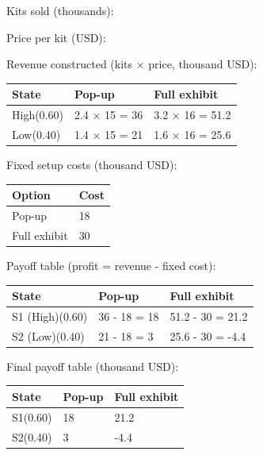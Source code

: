 \documentclass[11pt]{article}
\begin{document}
	
	Kits sold (thousands):
	
	Price per kit (USD):
	
	Revenue constructed (kits × price, thousand USD):
	\begin{center}
		\begin{tabular}{lll}
			\toprule
			State & Pop-up & Full exhibit \\
			\midrule
			High\newline (0.60) & 2.4 × 15 = 36 & 3.2 × 16 = 51.2 \\
			Low\newline (0.40) & 1.4 × 15 = 21 & 1.6 × 16 = 25.6 \\
			\bottomrule
		\end{tabular}
	\end{center}
	
	
	Fixed setup costs (thousand USD):
	\begin{center}
		\begin{tabular}{ll}
			\toprule
			Option & Cost \\
			\midrule
			Pop-up & 18 \\
			Full exhibit & 30 \\
			\bottomrule
		\end{tabular}
	\end{center}
	
	
	Payoff table (profit = revenue - fixed cost):
	\begin{center}
		\begin{tabular}{lll}
			\toprule
			State & Pop-up & Full exhibit \\
			\midrule
			S1 (High)\newline (0.60) & 36 - 18 = 18 & 51.2 - 30 = 21.2 \\
			S2 (Low)\newline (0.40) & 21 - 18 = 3 & 25.6 - 30 = -4.4 \\
			\bottomrule
		\end{tabular}
	\end{center}
	
	
	Final payoff table (thousand USD):
	\begin{center}
		\begin{tabular}{lll}
			\toprule
			State & Pop-up & Full exhibit \\
			\midrule
			S1\newline (0.60) & 18 & 21.2 \\
			S2\newline (0.40) & 3 & -4.4 \\
			\bottomrule
		\end{tabular}
	\end{center}
	
\end{document}
